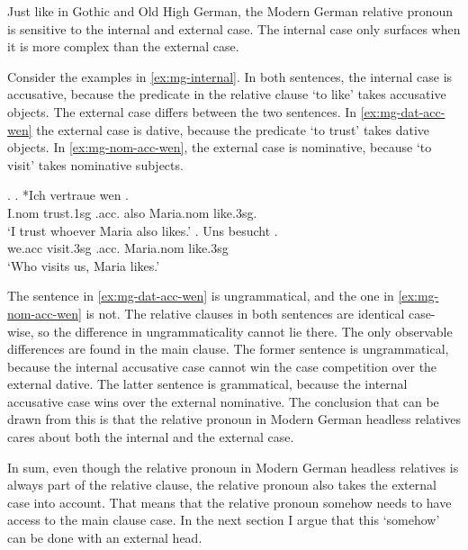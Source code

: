 Just like in Gothic and Old High German, the Modern German relative pronoun is sensitive to the internal and external case.
The internal case only surfaces when it is more complex than the external case.

Consider the examples in \ref{ex:mg-internal}. In both sentences, the internal case is accusative, because the predicate in the relative clause  `to like' takes accusative objects. The external case differs between the two sentences. In \ref{ex:mg-dat-acc-wen} the external case is dative, because the predicate  `to trust' takes dative objects.  In \ref{ex:mg-nom-acc-wen}, the external case is nominative, because  `to visit' takes nominative subjects.

\ex.\label{ex:mg-internal}
\ag. *Ich vertraue wen   . \\
I.\ac{nom} trust.1\ac{sg}\scsub{[dat]} .\ac{acc}. also Maria.\ac{nom} like.3\ac{sg}\scsub{[acc]}.\\
`I trust whoever Maria also likes.' \label{ex:mg-dat-acc-wen}
\bg. Uns besucht   .\\
 we.\ac{acc} visit.3\ac{sg}\scsub{[nom]} .\ac{acc}. Maria.\ac{nom} like.3\ac{sg}\scsub{[acc]}\\
 `Who visits us, Maria likes.' \label{ex:mg-nom-acc-wen}

The sentence in \ref{ex:mg-dat-acc-wen} is ungrammatical, and the one in \ref{ex:mg-nom-acc-wen} is not. The relative clauses in both sentences are identical case-wise, so the difference in ungrammaticality cannot lie there. The only observable differences are found in the main clause. The former sentence is ungrammatical, because the internal accusative case cannot win the case competition over the external dative. The latter sentence is grammatical, because the internal accusative case wins over the external nominative. The conclusion that can be drawn from this is that the relative pronoun in Modern German headless relatives cares about both the internal and the external case.

In sum, even though the relative pronoun in Modern German headless relatives is always part of the relative clause, the relative pronoun also takes the external case into account. That means that the relative pronoun somehow needs to have access to the main clause case. In the next section I argue that this `somehow' can be done with an external head.



